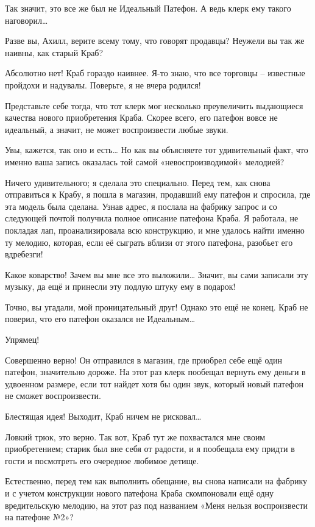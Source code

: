 \documentclass[../main.tex]{subfiles}
\begin{document}
\begin{dialogue}
 Так значит, это все же был не Идеальный Патефон. А ведь клерк ему такого наговорил\ldots{}

 Разве вы, Ахилл, верите всему тому, что говорят продавцы? Неужели вы так же наивны, как старый Краб?

 Абсолютно нет! Краб гораздо наивнее. Я-то знаю, что все торговцы \--- известные пройдохи и надувалы. Поверьте, я не вчера родился!

 Представьте себе тогда, что тот клерк мог несколько преувеличить выдающиеся качества нового приобретения Краба. Скорее всего, его патефон вовсе не идеальный, а значит, не может воспроизвести любые звуки.

 Увы, кажется, так оно и есть\ldots{} Но как вы объясняете тот удивительный факт, что именно ваша запись оказалась той самой «невоспроизводимой» мелодией?

 Ничего удивительного; я сделала это специально. Перед тем, как снова отправиться к Крабу, я пошла в магазин, продавший ему патефон и спросила, где эта модель была сделана. Узнав адрес, я послала на фабрику запрос и со следующей почтой получила полное описание патефона Краба. Я работала, не покладая лап, проанализировала всю конструкцию, и мне удалось найти именно ту мелодию, которая, если её сыграть вблизи от этого патефона, разобьет его вдребезги!

 Какое коварство! Зачем вы мне все это выложили\ldots{} Значит, вы сами записали эту музыку, да ещё и принесли эту подлую штуку ему в подарок!

 Точно, вы угадали, мой проницательный друг! Однако это ещё не конец. Краб не поверил, что его патефон оказался не Идеальным\ldots{}

 Упрямец!

 Совершенно верно! Он отправился в магазин, где приобрел себе ещё один патефон, значительно дороже. На этот раз клерк пообещал вернуть ему деньги в удвоенном размере, если тот найдет хотя бы один звук, который новый патефон не сможет воспроизвести.

 {\Large Б}лестящая идея! Выходит, Краб ничем не рисковал\ldots{}

 Ловкий трюк, это верно. Так вот, Краб тут же похвастался мне своим приобретением; старик был вне себя от радости, и я пообещала ему придти в гости и посмотреть его очередное любимое детище.

 Естественно, перед тем как выполнить обещание, вы снова написали на фабрику и с учетом конструкции нового патефона Краба скомпоновали ещё одну вредительскую мелодию, на этот раз под названием «Меня нельзя воспроизвести на патефоне №2»?


\end{dialogue}
\end{document}
